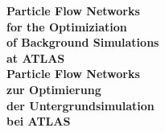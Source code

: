 \documentclass[11pt]{article}
\author{simmi}
\date{\today}
\title{}
\begin{document}
\pagestyle{fancy}
\begin{titlepage}
\begin{center}
\huge
 \hspace*{-0.73cm}
\maketitle
\textbf{Particle Flow Networks \\ for the Optimiziation \\ of Background Simulations \\ at ATLAS}\\
\vspace*{0.1cm}
\textbf{Particle Flow Networks \\ zur Optimierung \\ der Untergrundsimulation \\ bei ATLAS}\\



\end{center}
\end{titlepage}
\end{document}
